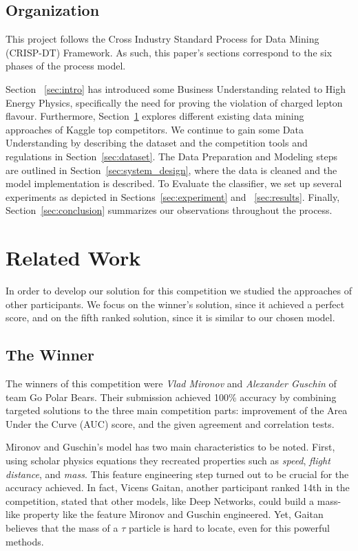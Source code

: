 \documentclass[conference]{IEEEtran}
\begin{document}
\subsection{Organization}
This project follows the Cross Industry Standard Process for Data Mining (CRISP-DT) Framework. As such, this paper's sections correspond to the six phases of the process model.

Section ~\ref{sec:intro} has introduced some Business Understanding related to High Energy Physics, specifically the need for proving the violation of charged lepton flavour. Furthermore, Section~\ref{sec:related_work} explores different existing data mining approaches of Kaggle top competitors. We continue to gain some Data Understanding by describing the dataset and the competition tools and regulations in Section~\ref{sec:dataset}. The Data Preparation and Modeling steps are outlined in Section~\ref{sec:system_design}, where the data is cleaned and the model implementation is described. To Evaluate the classifier, we set up several experiments as depicted in Sections~\ref{sec:experiment} and ~\ref{sec:results}. Finally, Section~\ref{sec:conclusion} summarizes our observations throughout the process.

\section{Related Work}
\label{sec:related_work}
In order to develop our solution for this competition we studied the approaches of other participants. We focus on the winner's solution, since it achieved a perfect score, and on the fifth ranked solution, since it is similar to our chosen model.

\subsection{The Winner}
The winners of this competition were \textit{Vlad Mironov} and \textit{Alexander Guschin} of team Go Polar Bears. Their submission achieved 100\% accuracy by combining targeted solutions to the three main competition parts: improvement of the Area Under the Curve (AUC) score, and the given agreement and correlation tests.

Mironov and Guschin's model has two main characteristics to be noted. First, using scholar physics equations they recreated properties such as \textit{speed}, \textit{flight distance}, and \textit{mass}. This feature engineering step turned out to be crucial for the accuracy achieved. In fact, Vicens Gaitan, another participant ranked 14th in the competition, stated that other models, like Deep Networks, could build a mass-like property like the feature Mironov and Guschin engineered. Yet, Gaitan believes that the mass of a $\tau$ particle is hard to locate, even for this powerful methods.
\end{document}
